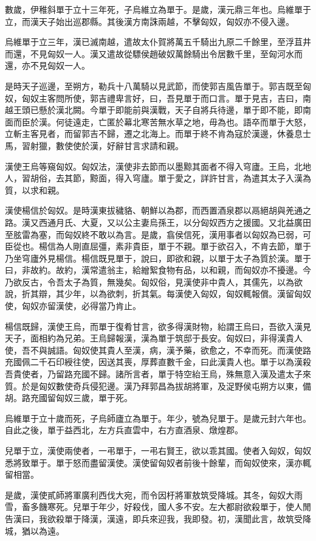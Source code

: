 數歲，伊稚斜單于立十三年死，子烏維立為單于。是歲，漢元鼎三年也。烏維單于立，而漢天子始出巡郡縣。其後漢方南誅兩越，不擊匈奴，匈奴亦不侵入邊。

烏維單于立三年，漢已滅南越，遣故太仆賀將萬五千騎出九原二千餘里，至浮苴井而還，不見匈奴一人。漢又遣故從驃侯趙破奴萬餘騎出令居數千里，至匈河水而還，亦不見匈奴一人。

是時天子巡邊，至朔方，勒兵十八萬騎以見武節，而使郭吉風告單于。郭吉既至匈奴，匈奴主客問所使，郭吉禮卑言好，曰，吾見單于而口言。單于見吉，吉曰，南越王頭已懸於漢北闕。今單于即能前與漢戰，天子自將兵待邊，單于即不能，即南面而臣於漢。何徒遠走，亡匿於幕北寒苦無水草之地，毋為也。語卒而單于大怒，立斬主客見者，而留郭吉不歸，遷之北海上。而單于終不肯為寇於漢邊，休養息士馬，習射獵，數使使於漢，好辭甘言求請和親。

漢使王烏等窺匈奴。匈奴法，漢使非去節而以墨黥其面者不得入穹廬。王烏，北地人，習胡俗，去其節，黥面，得入穹廬。單于愛之，詳許甘言，為遣其太子入漢為質，以求和親。

漢使楊信於匈奴。是時漢東拔穢貉、朝鮮以為郡，而西置酒泉郡以鬲絕胡與羌通之路。漢又西通月氏、大夏，又以公主妻烏孫王，以分匈奴西方之援國。又北益廣田至胘雷為塞，而匈奴終不敢以為言。是歲，翕侯信死，漢用事者以匈奴為已弱，可臣從也。楊信為人剛直屈彊，素非貴臣，單于不親。單于欲召入，不肯去節，單于乃坐穹廬外見楊信。楊信既見單于，說曰，即欲和親，以單于太子為質於漢。單于曰，非故約。故約，漢常遣翁主，給繒絮食物有品，以和親，而匈奴亦不擾邊。今乃欲反古，令吾太子為質，無幾矣。匈奴俗，見漢使非中貴人，其儒先，以為欲說，折其辯，其少年，以為欲刺，折其氣。每漢使入匈奴，匈奴輒報償。漢留匈奴使，匈奴亦留漢使，必得當乃肯止。

楊信既歸，漢使王烏，而單于復肴甘言，欲多得漢財物，紿謂王烏曰，吾欲入漢見天子，面相約為兄弟。王烏歸報漢，漢為單于筑邸于長安。匈奴曰，非得漢貴人使，吾不與誠語。匈奴使其貴人至漢，病，漢予藥，欲愈之，不幸而死。而漢使路充國佩二千石印綬往使，因送其喪，厚葬直數千金，曰此漢貴人也。單于以為漢殺吾貴使者，乃留路充國不歸。諸所言者，單于特空紿王烏，殊無意入漢及遣太子來質。於是匈奴數使奇兵侵犯邊。漢乃拜郭昌為拔胡將軍，及浞野侯屯朔方以東，備胡。路充國留匈奴三歲，單于死。

烏維單于立十歲而死，子烏師廬立為單于。年少，號為兒單于。是歲元封六年也。自此之後，單于益西北，左方兵直雲中，右方直酒泉、燉煌郡。

兒單于立，漢使兩使者，一弔單于，一弔右賢王，欲以乖其國。使者入匈奴，匈奴悉將致單于。單于怒而盡留漢使。漢使留匈奴者前後十餘輩，而匈奴使來，漢亦輒留相當。

是歲，漢使貳師將軍廣利西伐大宛，而令因杅將軍敖筑受降城。其冬，匈奴大雨雪，畜多饑寒死。兒單于年少，好殺伐，國人多不安。左大都尉欲殺單于，使人閒告漢曰，我欲殺單于降漢，漢遠，即兵來迎我，我即發。初，漢聞此言，故筑受降城，猶以為遠。

